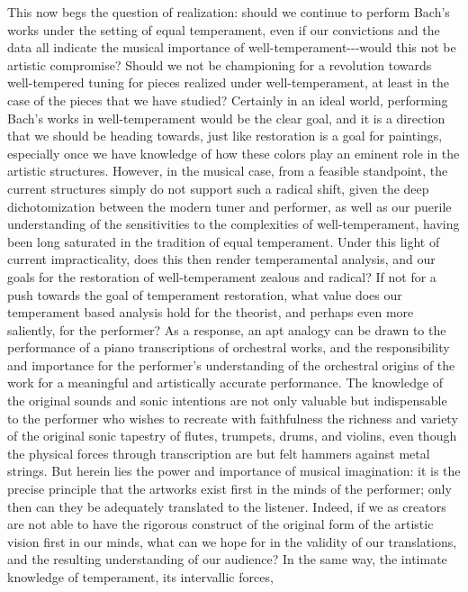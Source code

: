 This now begs the question of realization: should we continue to perform
Bach's works under the setting of equal temperament, even if our
convictions and the data all indicate the musical importance of
well-temperament-\/-\/-would this not be artistic compromise? Should we
not be championing for a revolution towards well-tempered tuning for
pieces realized under well-temperament, at least in the case of the
pieces that we have studied? Certainly in an ideal world, performing
Bach's works in well-temperament would be the clear goal, and it is a
direction that we should be heading towards, just like restoration is a
goal for paintings, especially once we have knowledge of how these
colors play an eminent role in the artistic structures. However, in the
musical case, from a feasible standpoint, the current structures simply
do not support such a radical shift, given the deep dichotomization
between the modern tuner and performer, as well as our puerile
understanding of the sensitivities to the complexities of
well-temperament, having been long saturated in the tradition of equal
temperament. Under this light of current impracticality, does this then
render temperamental analysis, and our goals for the restoration of
well-temperament zealous and radical? If not for a push towards the goal
of temperament restoration, what value does our temperament based
analysis hold for the theorist, and perhaps even more saliently, for the
performer? As a response, an apt analogy can be drawn to the performance
of a piano transcriptions of orchestral works, and the responsibility
and importance for the performer's understanding of the orchestral
origins of the work for a meaningful and artistically accurate
performance. The knowledge of the original sounds and sonic intentions
are not only valuable but indispensable to the performer who wishes to
recreate with faithfulness the richness and variety of the original
sonic tapestry of flutes, trumpets, drums, and violins, even though the
physical forces through transcription are but felt hammers against metal
strings. But herein lies the power and importance of musical
imagination: it is the precise principle that the artworks exist first
in the minds of the performer; only then can they be adequately
translated to the listener. Indeed, if we as creators are not able to
have the rigorous construct of the original form of the artistic vision
first in our minds, what can we hope for in the validity of our
translations, and the resulting understanding of our audience? In the
same way, the intimate knowledge of temperament, its intervallic forces,
